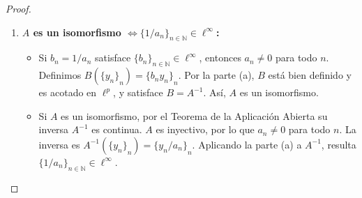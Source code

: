 \documentclass{article}
\theoremstyle{definition}
\newcommand{\N}{\mathbb{N}}
\begin{document}
\begin{proof}
\begin{enumerate}
\begin{enumerate}
                  \item \textbf{\(A\) es un isomorfismo \(\iff {\{ 1/a_n \}}_{ n\in\N} \in \ell^\infty \):}
                        \begin{itemize}
                            \item [\((\Leftarrow)\)] Si \(b_n = 1/a_n\) satisface \({\{b_n\}}_{n\in\N} \in \ell^\infty \), entonces \(a_n \neq 0\) para todo \(n\). Definimos \( B({\{y_n\}}_n) = {\{b_n y_n\}}_n\). Por la parte (a), \(B\) está bien definido y es acotado en \(\ell^p\), y satisface \(B = A^{-1}\). Así, \(A\) es un isomorfismo.
                            \item [\((\Rightarrow)\)] Si \(A\) es un isomorfismo, por el Teorema de la Aplicación Abierta su inversa \(A^{-1}\) es continua. \(A\) es inyectivo, por lo que \( a_n \neq 0 \) para todo \( n \). La inversa es \( A^{-1}({\{y_n\}}_n) = \{{y_n / a_n\}}_n\). Aplicando la parte (a) a \(A^{-1}\), resulta \({\{1/a_n\}}_{n\in\mathbb{N}} \in \ell^\infty \).
                        \end{itemize}

              \end{enumerate}
    \end{enumerate}
\end{proof}

\vspace{0.5cm}
\end{document}
